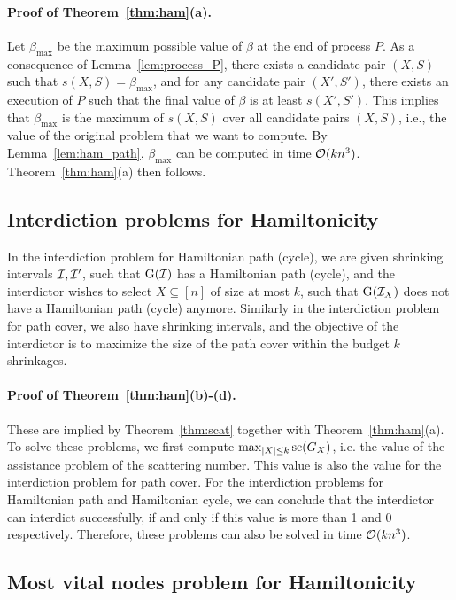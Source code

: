 \paragraph*{Proof of Theorem~\ref{thm:ham}(a).}
Let $\beta_{\max}$ be the maximum possible value of $\beta$ at the end of process $P$.
As a consequence of Lemma~\ref{lem:process_P}, there exists a candidate pair $(X,S)$ such that $s(X,S) = \beta_{\max}$, and
for any candidate pair $(X',S')$, there exists an execution of $P$ such that the final value of $\beta$ is at least $s(X',S')$.
This implies that $\beta_{\max}$ is the maximum of $s(X,S)$ over all candidate pairs $(X,S)$, i.e., the value of the original problem that we want to compute.
By Lemma~\ref{lem:ham_path}, $\beta_{\max}$ can be computed in time $\mathcal{O}(kn^3)$.
Theorem~\ref{thm:ham}(a) then follows.
 

\subsection{Interdiction problems for Hamiltonicity}
\label{subsection:ham_interdict}

In the interdiction problem for Hamiltonian path (cycle), we are given shrinking intervals $\mathcal{I}, \mathcal{I}'$, such that $\operatorname{G}(\mathcal{I})$ has a Hamiltonian path (cycle), and the interdictor wishes to select $X \subseteq [n]$ of size at most $k$, such that $\operatorname{G}(\mathcal{I}_X)$ does not have a Hamiltonian path (cycle) anymore.
Similarly in the interdiction problem for path cover, we also have shrinking intervals, and the objective of the interdictor is to maximize the size of the path cover within the budget $k$ shrinkages.

\paragraph*{Proof of Theorem~\ref{thm:ham}(b)-(d).}
These are implied by Theorem~\ref{thm:scat} together with Theorem~\ref{thm:ham}(a).
To solve these problems, we first compute $\max_{|X| \leq k}\text{sc}(G_X)$, i.e. the value of the assistance problem of the scattering number.
This value is also the value for the interdiction problem for path cover.
For the interdiction problems for Hamiltonian path and Hamiltonian cycle, we can conclude that the interdictor can interdict successfully, if and only if this value is more than 1 and 0 respectively.
Therefore, these problems can also be solved in time $\mathcal{O}(kn^3)$.
 

\subsection{Most vital nodes problem for Hamiltonicity}
\label{subsection:ham_mvn}

